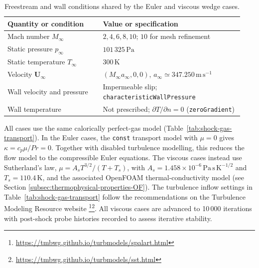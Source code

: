 \begin{table}[H]
    \centering
    \caption{Freestream and wall conditions shared by the Euler and viscous wedge cases.}
    \label{tab:shock-inflow-wall}
    \small
    \begin{tabular}{@{}p{0.38\linewidth}p{0.56\linewidth}@{}}
        \toprule
        Quantity or condition & Value or specification \\
        \midrule
        Mach number \(M_\infty\) & \(2,4,6,8,10\); \(10\) for mesh refinement \\
        Static pressure \(p_\infty\) & \(101\,325\,\mathrm{Pa}\) \\
        Static temperature \(T_\infty\) & \(300\,\mathrm{K}\) \\
        Velocity \(\boldsymbol{U}_\infty\)
            & \((M_\infty a_\infty,0,0)\),
              \(a_\infty\simeq347.250\,\mathrm{m\,s^{-1}}\) \\
        Wall velocity and pressure
            & Impermeable slip; \texttt{characteristicWallPressure} \\
        Wall temperature
            & Not prescribed; \(\partial T/\partial n=0\)
              (\texttt{zeroGradient}) \\
        \bottomrule
    \end{tabular}
\end{table}

All cases use the same calorically perfect-gas model
(Table~\ref{tab:shock-gas-transport}). In the Euler cases, the \texttt{const}
transport model with \(\mu=0\) gives \(\kappa=c_p\mu/Pr=0\). Together with
disabled turbulence modelling, this reduces the flow model to the compressible
Euler equations. The viscous cases instead use Sutherland's law,
\(\mu=A_sT^{3/2}/(T+T_s)\), with
\(A_s=1.458\times10^{-6}\,\mathrm{Pa\,s\,K^{-1/2}}\) and
\(T_s=110.4\,\mathrm{K}\), and the associated OpenFOAM thermal-conductivity
model (see Section \ref{subsec:thermophysical-properties-OF}). The turbulence inflow settings in Table~\ref{tab:shock-gas-transport} follow the recommendations on the Turbulence Modeling Resource website \footnote{\url{https://tmbwg.github.io/turbmodels/spalart.html}}\footnote{\url{https://tmbwg.github.io/turbmodels/sst.html}}. All viscous cases are advanced to 10\,000 iterations with post-shock probe histories recorded to assess iterative stability.

